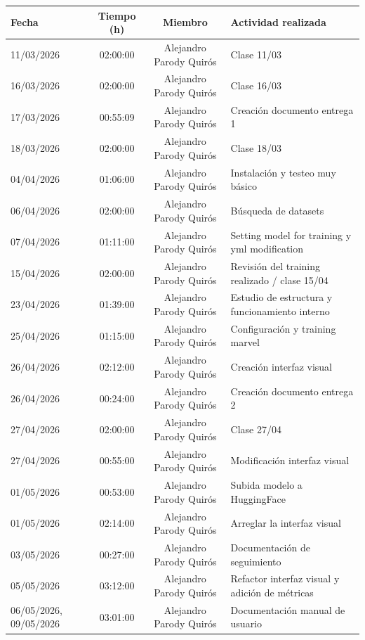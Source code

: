 \documentclass[a4paper]{article}
\begin{document}
\begin{center}
\begin{tabular}{|p{3.5cm}|c|c|p{6cm}|}
\hline
\textbf{Fecha} & \textbf{Tiempo (h)} & \textbf{Miembro} & \textbf{Actividad realizada} \\\hline
11/03/2026 & 02:00:00 & Alejandro Parody Quirós & Clase 11/03 \\\hline
16/03/2026 & 02:00:00 & Alejandro Parody Quirós & Clase 16/03 \\\hline
17/03/2026 & 00:55:09 & Alejandro Parody Quirós & Creación documento entrega 1 \\\hline
18/03/2026 & 02:00:00 & Alejandro Parody Quirós & Clase 18/03 \\\hline
04/04/2026 & 01:06:00 & Alejandro Parody Quirós & Instalación y testeo muy básico \\\hline
06/04/2026 & 02:00:00 & Alejandro Parody Quirós & Búsqueda de datasets \\\hline
07/04/2026 & 01:11:00 & Alejandro Parody Quirós & Setting model for training y yml modification \\\hline
15/04/2026 & 02:00:00 & Alejandro Parody Quirós & Revisión del training realizado / clase 15/04 \\\hline
23/04/2026 & 01:39:00 & Alejandro Parody Quirós & Estudio de estructura y funcionamiento interno \\\hline
25/04/2026 & 01:15:00 & Alejandro Parody Quirós & Configuración y training marvel \\\hline
26/04/2026 & 02:12:00 & Alejandro Parody Quirós & Creación interfaz visual \\\hline
26/04/2026 & 00:24:00 & Alejandro Parody Quirós & Creación documento entrega 2 \\\hline
27/04/2026 & 02:00:00 & Alejandro Parody Quirós & Clase 27/04 \\\hline
27/04/2026 & 00:55:00 & Alejandro Parody Quirós & Modificación interfaz visual \\\hline
01/05/2026 & 00:53:00 & Alejandro Parody Quirós & Subida modelo a HuggingFace \\\hline
01/05/2026 & 02:14:00 & Alejandro Parody Quirós & Arreglar la interfaz visual \\\hline
03/05/2026 & 00:27:00 & Alejandro Parody Quirós & Documentación de seguimiento \\\hline
05/05/2026 & 03:12:00 & Alejandro Parody Quirós & Refactor interfaz visual y adición de métricas \\\hline
06/05/2026, 09/05/2026 & 03:01:00 & Alejandro Parody Quirós & Documentación manual de usuario \\\hline

\end{tabular}
\end{center}
\end{document}
